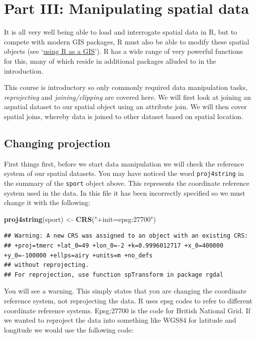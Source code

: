 \documentclass[]{article}
\newenvironment{Shaded}{}{}
\newcommand{\KeywordTok}[1]{\textcolor[rgb]{0.00,0.44,0.13}{\textbf{{#1}}}}
\newcommand{\StringTok}[1]{\textcolor[rgb]{0.25,0.44,0.63}{{#1}}}
\newcommand{\NormalTok}[1]{{#1}}
\begin{document}
\section{Part III: Manipulating spatial data}

It is all very well being able to load and interrogate spatial data in
R, but to compete with modern GIS packages, R must also be able to
modify these spatial objects (see
`\href{https://github.com/Pakillo/R-GIS-tutorial}{using R as a GIS}'). R
has a wide range of very powerful functions for this, many of which
reside in additional packages alluded to in the introduction.

This course is introductory so only commonly required data manipulation
tasks, \emph{reprojecting} and \emph{joining/clipping} are covered here.
We will first look at joining an aspatial dataset to our spatial object
using an attribute join. We will then cover spatial joins, whereby data
is joined to other dataset based on spatial location.

\subsection{Changing projection}

First things first, before we start data manipulation we will check the
reference system of our spatial datasets. You may have noticed the word
\texttt{proj4string} in the summary of the \texttt{sport} object above.
This represents the coordinate reference system used in the data. In
this file it has been incorrectly specified so we must change it with
the following:

\begin{Shaded}
\begin{Highlighting}[]
\KeywordTok{proj4string}\NormalTok{(sport) <- }\KeywordTok{CRS}\NormalTok{(}\StringTok{"+init=epsg:27700"}\NormalTok{)}
\end{Highlighting}
\end{Shaded}
\begin{verbatim}
## Warning: A new CRS was assigned to an object with an existing CRS:
## +proj=tmerc +lat_0=49 +lon_0=-2 +k=0.9996012717 +x_0=400000 +y_0=-100000 +ellps=airy +units=m +no_defs
## without reprojecting.
## For reprojection, use function spTransform in package rgdal
\end{verbatim}
You will see a warning. This simply states that you are changing the
coordinate reference system, not reprojecting the data. R uses epsg
codes to refer to different coordinate reference systems. Epsg:27700 is
the code for British National Grid. If we wanted to reproject the data
into something like WGS84 for latitude and longitude we would use the
following code:
\end{document}
